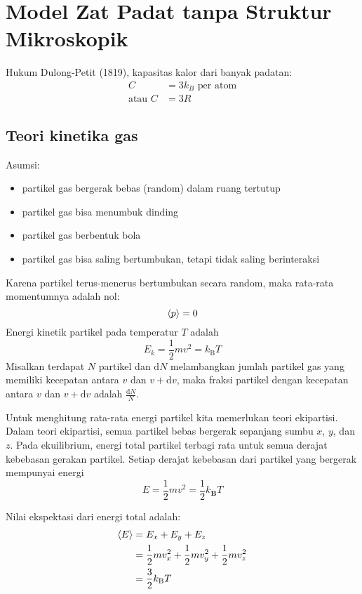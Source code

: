 \chapter{Model Zat Padat tanpa Struktur Mikroskopik}

Hukum Dulong-Petit (1819), kapasitas kalor dari banyak padatan:
\begin{align}
C & = 3k_{B}\,\,\text{per atom} \\
\text{atau}\,\, C & = 3R
\end{align}


\section{Teori kinetika gas}
Asumsi:
\begin{itemize}
\item partikel gas bergerak bebas (random) dalam ruang tertutup
\item partikel gas bisa menumbuk dinding
\item partikel gas berbentuk bola
\item partikel gas bisa saling bertumbukan, tetapi tidak saling berinteraksi
\end{itemize}

Karena partikel terus-menerus bertumbukan secara random, maka rata-rata momentumnya
adalah nol:
\begin{equation}
\braket{p} = 0
\end{equation}
Energi kinetik partikel pada temperatur $T$ adalah
\begin{equation}
E_{k} = \frac{1}{2} m v^2 = k_{\mathrm{B}} T
\end{equation}
Misalkan terdapat $N$ partikel dan $\mathrm{d}N$ melambangkan jumlah partikel
gas yang memiliki kecepatan antara $v$ dan $v + \mathrm{d}v$, maka fraksi partikel
dengan kecepatan antara $v$ dan $v + \mathrm{d}v$ adalah $\frac{\mathrm{d}N}{N}$.

Untuk menghitung rata-rata energi partikel kita memerlukan teori ekipartisi. Dalam teori
ekipartisi, semua partikel bebas bergerak sepanjang sumbu $x$, $y$, dan $z$.
Pada ekuilibrium, energi total partikel terbagi rata untuk semua derajat kebebasan
gerakan partikel. Setiap derajat kebebasan dari partikel yang bergerak mempunyai energi
\begin{equation*}
E = \frac{1}{2} m v^2 = \frac{1}{2} k_{\mathbf{B}} T
\end{equation*}

Nilai ekspektasi dari energi total adalah:
\begin{align*}
\braket{E} & = E_{x} + E_{y} + E_{z} \\
& = \frac{1}{2} m v_{x}^2 + \frac{1}{2} m v_{y}^2 + \frac{1}{2} m v_{z}^2 \\
& = \frac{3}{2} k_{\mathrm{B}} T
\end{align*}

